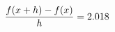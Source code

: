\documentclass[preview]{standalone}
\begin{document}
\begin{align*}
\special{dvisvgm:raw <g id='unique000'>}\frac{f(x+h)-f(x)}{h} = 2.018\special{dvisvgm:raw </g>}
\end{align*}
\end{document}
